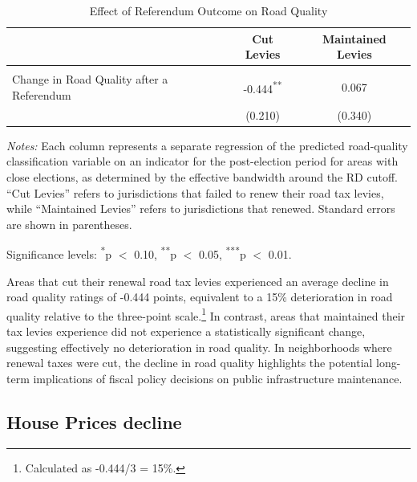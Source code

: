 \begin{table}[ht]
    \centering
    \caption{Effect of Referendum Outcome on Road Quality}
    \label{tab:roadquality_estimates}
    \begin{threeparttable}
    \begin{tabular}{lcc}
    \hline\hline
     & \textbf{Cut Levies} & \textbf{Maintained Levies} \\
    \hline
    \\[-0.3cm] %
    Change in Road Quality after a Referendum 
     & -0.444\textsuperscript{**} & 0.067 \\[0.2cm] %
     & (0.210) & (0.340) \\  
    \hline
    \end{tabular}
    \begin{tablenotes}
    \small
    \item \textit{Notes:} Each column represents a separate regression of the predicted  road-quality classification variable on an indicator for the post-election period for areas with close elections, as determined by the effective bandwidth around the RD cutoff. “Cut Levies” refers to jurisdictions that failed to renew their road tax levies, while “Maintained Levies” refers to jurisdictions that renewed. Standard errors are shown in parentheses. 
    
    \item Significance levels: 
    \textsuperscript{*}p $<$ 0.10,  
    \textsuperscript{**}p $<$ 0.05, 
    \textsuperscript{***}p $<$ 0.01.
    \end{tablenotes}
    \end{threeparttable}
\end{table}


Areas that cut their renewal road tax levies experienced an average decline in road quality ratings of -0.444 points, equivalent to a 15\% deterioration in road quality relative to the three-point scale.\footnote{Calculated as -0.444/3 = 15\%.} In contrast, areas that maintained their tax levies experience did not experience a statistically significant change, suggesting effectively no deterioration in road quality. In neighborhoods where renewal taxes were cut, the decline in road quality highlights the potential long-term implications of fiscal policy decisions on public infrastructure maintenance.

\subsection{House Prices decline}

